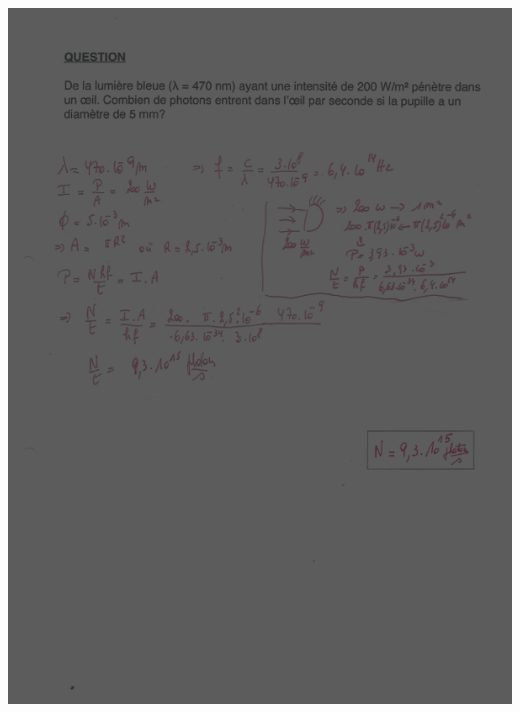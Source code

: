 {\includegraphics[width=17.498cm,height=24.13cm]{Pictures/10000001000002570000033B1D8D222AA0515BC3.png}

}
